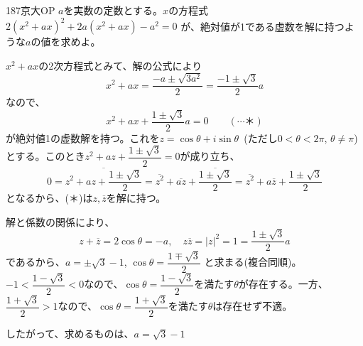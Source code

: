 \begin{prob}{187}{}{京大OP}
 $a$を実数の定数とする。$x$の方程式 $2(x^2+ax)^2+2a(x^2+ax)-a^2=0$ が、絶対値が1である虚数を解に持つような$a$の値を求めよ。
\end{prob}

$x^2+ax$の2次方程式とみて、解の公式により
\[ x^2+ax=\frac{-a\pm\sqrt{3a^2}}{2}=\frac{-1\pm\sqrt{3}}{2}a \]
なので、
\[ x^2+ax+\frac{1\pm\sqrt{3}}{2}a=0 \qquad (\cdots \text{＊}) \]
が絶対値1の虚数解を持つ。これを$z=\cos\theta+i\sin\theta$~(ただし$0<\theta<2\pi$, $\theta\neq\pi$)とする。このとき$z^2+az+\dfrac{1\pm\sqrt{3}}{2}=0$が成り立ち、
\[ 0=\overline{z^2+az+\frac{1\pm\sqrt{3}}{2}}=\overline{z^2}+\overline{az}+\overline{\frac{1\pm\sqrt{3}}{2}}=\overline{z^2}+a\overline{z}+\frac{1\pm\sqrt{3}}{2} \]
となるから、(＊)は$z, \overline{z}$を解に持つ。

解と係数の関係により、
\[ z+\overline{z}=2\cos\theta=-a,\quad z\overline{z}=|z|^2=1=\frac{1\pm\sqrt{3}}{2}a \]
であるから、$a=\pm\sqrt{3}-1$, $\cos\theta=\dfrac{1\mp\sqrt{3}}{2}$ と求まる(複合同順)。$-1<\dfrac{1-\sqrt{3}}{2}<0$なので、$\cos\theta=\dfrac{1-\sqrt{3}}{2}$を満たす$\theta$が存在する。一方、$\dfrac{1+\sqrt{3}}{2}>1$なので、$\cos\theta=\dfrac{1+\sqrt{3}}{2}$を満たす$\theta$は存在せず不適。

したがって、求めるものは、$a=\sqrt{3}-1$